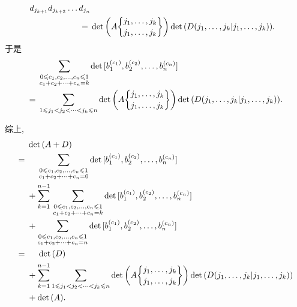 \documentclass[../libro.tex]{subfiles}
\begin{document}
\begin{example}
\begin{align*}
        \,
        d_{j_{k+1}} d_{j_{k+2}} \dots d_{j_n}
        \\
        = {} &
        \det {\left(
                A\submat{j_1,\dots,j_k}{j_1,\dots,j_k}
        \right)}
        \det {(D({j_1,\dots,j_k}|{j_1,\dots,j_k}))}.
    \end{align*}
    于是
    \begin{align*}
        &
        \sum_{\substack{0 \leq c_1, c_2, \dots, c_n \leq 1 \\
        c_1 + c_2 + \dots + c_n = k}}
        \det {[b_1^{(c_1)}, b_2^{(c_2)}, \dots, b_n^{(c_n)}]}
        \\
        = {} &
        \sum_{1 \leq j_1 < j_2 < \dots < j_k \leq n}
        \det {\left(
                A\submat{j_1,\dots,j_k}{j_1,\dots,j_k}
        \right)}
        \det {(D({j_1,\dots,j_k}|{j_1,\dots,j_k}))}.
    \end{align*}

    综上,
    \begin{align*}
        &
        \det {(A + D)}
        \\
        = {} &
        \hphantom{{} + {}}
        \sum_{\substack{0 \leq c_1, c_2, \dots, c_n \leq 1 \\
        c_1 + c_2 + \dots + c_n = 0}}
        \det {[b_1^{(c_1)}, b_2^{(c_2)}, \dots, b_n^{(c_n)}]}
        \\
        &
        +
        \sum_{k = 1}^{n-1}\,
        \sum_{\substack{0 \leq c_1, c_2, \dots, c_n \leq 1 \\
        c_1 + c_2 + \dots + c_n = k}}
        \det {[b_1^{(c_1)}, b_2^{(c_2)}, \dots, b_n^{(c_n)}]}
        \\
        &
        +
        \sum_{\substack{0 \leq c_1, c_2, \dots, c_n \leq 1 \\
        c_1 + c_2 + \dots + c_n = n}}
        \det {[b_1^{(c_1)}, b_2^{(c_2)}, \dots, b_n^{(c_n)}]}
        \\
        = {} &
        \hphantom{{} + {}}
        \det {(D)}
        \\
        &
        + \sum_{k = 1}^{n-1}
        {
            \sum_{1 \leq j_1 < j_2 < \dots < j_k \leq n}
            \det {\left(
                    A\submat{j_1,\dots,j_k}{j_1,\dots,j_k}
            \right)}
            \det {(D({j_1,\dots,j_k}|{j_1,\dots,j_k}))}
        }
        \\
        &
        + \det {(A)}.
        \qefhere
    \end{align*}
\end{example}
\end{document}

